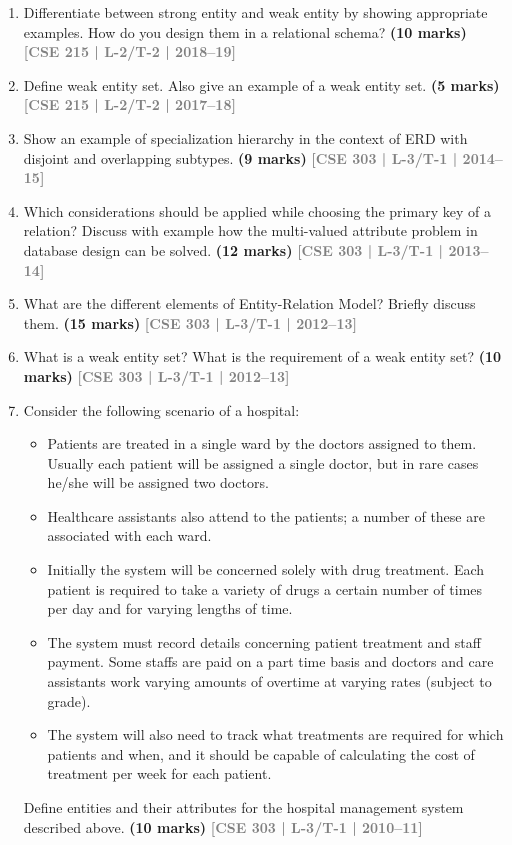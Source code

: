 \documentclass[12pt]{article}
\newcommand{\yr}[1]{\hfill\textcolor{gray}{\small\textbf{[#1]}}}
\newcommand{\mk}[1]{\textcolor{orange!70!black}{\small\textbf{(#1 marks)}}}
\begin{document}
\begin{enumerate}


\item Differentiate between strong entity and weak entity by showing appropriate examples. How do you design them in a relational schema?
\mk{10} \yr{CSE 215 | L-2/T-2 | 2018--19}


\item Define weak entity set. Also give an example of a weak entity set.
\mk{5} \yr{CSE 215 | L-2/T-2 | 2017--18}






\item Show an example of specialization hierarchy in the context of ERD with disjoint and overlapping subtypes.
\mk{9} \yr{CSE 303 | L-3/T-1 | 2014--15}


\item Which considerations should be applied while choosing the primary key of a relation? Discuss with example how the multi-valued attribute problem in database design can be solved.
\mk{12} \yr{CSE 303 | L-3/T-1 | 2013--14}


\item What are the different elements of Entity-Relation Model? Briefly discuss them.
\mk{15} \yr{CSE 303 | L-3/T-1 | 2012--13}


\item What is a weak entity set? What is the requirement of a weak entity set?
\mk{10} \yr{CSE 303 | L-3/T-1 | 2012--13}


\item Consider the following scenario of a hospital:

\begin{itemize}[leftmargin=1.5em,itemsep=2pt]
  \item Patients are treated in a single ward by the doctors assigned to them. Usually each patient will be assigned a single doctor, but in rare cases he/she will be assigned two doctors.
  \item Healthcare assistants also attend to the patients; a number of these are associated with each ward.
  \item Initially the system will be concerned solely with drug treatment. Each patient is required to take a variety of drugs a certain number of times per day and for varying lengths of time.
  \item The system must record details concerning patient treatment and staff payment. Some staffs are paid on a part time basis and doctors and care assistants work varying amounts of overtime at varying rates (subject to grade).
  \item The system will also need to track what treatments are required for which patients and when, and it should be capable of calculating the cost of treatment per week for each patient.
\end{itemize}

Define entities and their attributes for the hospital management system described above.
\mk{10} \yr{CSE 303 | L-3/T-1 | 2010--11}


\end{enumerate}
\end{document}
